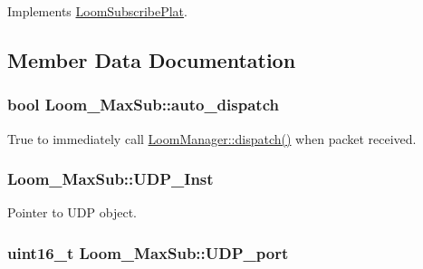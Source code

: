 Implements \hyperlink{class_loom_subscribe_plat_ad80fe04ecc6d8d1c2c5f093b9c4e9b72}{Loom\+Subscribe\+Plat}.



\subsection{Member Data Documentation}
\subsubsection[{\texorpdfstring{auto\+\_\+dispatch}{auto_dispatch}}]{\setlength{\rightskip}{0pt plus 5cm}bool Loom\+\_\+\+Max\+Sub\+::auto\+\_\+dispatch\hspace{0.3cm}{\ttfamily [protected]}}\hypertarget{class_loom___max_sub_adb1bf0c7394ff4ebaa1e893fb55356ff}{}\label{class_loom___max_sub_adb1bf0c7394ff4ebaa1e893fb55356ff}


True to immediately call \hyperlink{class_loom_manager_a80fb13974b3bde9b0cedcd43732d7226}{Loom\+Manager\+::dispatch()} when packet received. 

\subsubsection[{\texorpdfstring{U\+D\+P\+\_\+\+Inst}{UDP_Inst}}]{ Loom\+\_\+\+Max\+Sub\+::\+U\+D\+P\+\_\+\+Inst\hspace{0.3cm}{\ttfamily [protected]}}\hypertarget{class_loom___max_sub_aa41703fadde1c5aca2c265eba0e2d13e}{}\label{class_loom___max_sub_aa41703fadde1c5aca2c265eba0e2d13e}


Pointer to U\+DP object. 

\subsubsection[{\texorpdfstring{U\+D\+P\+\_\+port}{UDP_port}}]{\setlength{\rightskip}{0pt plus 5cm}uint16\+\_\+t Loom\+\_\+\+Max\+Sub\+::\+U\+D\+P\+\_\+port\hspace{0.3cm}{\ttfamily [protected]}}\hypertarget{class_loom___max_sub_a0b60c2de2c1a5e2259cc5723edd9d51c}{}\label{class_loom___max_sub_a0b60c2de2c1a5e2259cc5723edd9d51c}


